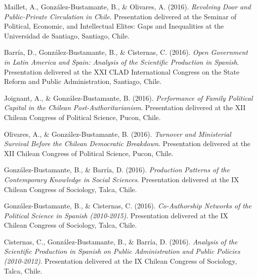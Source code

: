 \begin{publications}
\begin{benumerate}{71}
\item{\small Maillet, A., González-Bustamante, B., \& Olivares, A. (2016). {\itshape Revolving Door and Public-Private Circulation in Chile}. Presentation delivered at the Seminar of Political, Economic, and Intellectual Elites: Gaps and Inequalities at the Universidad de Santiago, Santiago, Chile.}\vspace{1mm}

\item{\small Barría, D., González-Bustamante, B., \& Cisternas, C. (2016). {\itshape Open Government in Latin America and Spain: Analysis of the Scientific Production in Spanish}. Presentation delivered at the XXI CLAD International Congress on the State Reform and Public Administration, Santiago, Chile.}\vspace{1mm}

\item{\small Joignant, A., \& González-Bustamante, B. (2016). {\itshape Performance of Family Political Capital in the Chilean Post-Authoritarianism}. Presentation delivered at the XII Chilean Congress of Political Science, Pucon, Chile.}\vspace{1mm}

\item{\small Olivares, A., \& González-Bustamante, B. (2016). {\itshape Turnover and Ministerial Survival Before the Chilean Democratic Breakdown}. Presentation delivered at the XII Chilean Congress of Political Science, Pucon, Chile.}\vspace{1mm}

\item{\small González-Bustamante, B., \& Barría, D. (2016). {\itshape Production Patterns of the Contemporary Knowledge in Social Sciences}. Presentation delivered at the IX Chilean Congress of Sociology, Talca, Chile.}\vspace{1mm}

\item{\small González-Bustamante, B., \& Cisternas, C. (2016). {\itshape Co-Authorship Networks of the Political Science in Spanish (2010-2015)}. Presentation delivered at the IX Chilean Congress of Sociology, Talca, Chile.}\vspace{1mm}

\item{\small Cisternas, C., González-Bustamante, B., \& Barría, D. (2016). {\itshape Analysis of the Scientific Production in Spanish on Public Administration and Public Policies (2010-2012)}. Presentation delivered at the IX Chilean Congress of Sociology, Talca, Chile.}\vspace{1mm}


\end{benumerate}
\end{publications}
